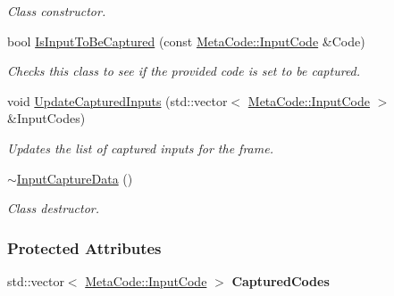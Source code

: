 \begin{DoxyCompactItemize}
\begin{DoxyCompactList}\small\item\em Class constructor. \item\end{DoxyCompactList}\item 
bool \hyperlink{classMezzanine_1_1UI_1_1InputCaptureData_a7a98f65e0666098367faf7d186a82e7f}{IsInputToBeCaptured} (const \hyperlink{classMezzanine_1_1MetaCode_a3b5633f0145bf3287cf53a3f05b5563c}{MetaCode::InputCode} \&Code)
\begin{DoxyCompactList}\small\item\em Checks this class to see if the provided code is set to be captured. \item\end{DoxyCompactList}\item 
void \hyperlink{classMezzanine_1_1UI_1_1InputCaptureData_a3a5e02a1c9606f4be323a40b6766f675}{UpdateCapturedInputs} (std::vector$<$ \hyperlink{classMezzanine_1_1MetaCode_a3b5633f0145bf3287cf53a3f05b5563c}{MetaCode::InputCode} $>$ \&InputCodes)
\begin{DoxyCompactList}\small\item\em Updates the list of captured inputs for the frame. \item\end{DoxyCompactList}\item 
\hypertarget{classMezzanine_1_1UI_1_1InputCaptureData_a5af70301db449b037a56316ef7513f0a}{
\hyperlink{classMezzanine_1_1UI_1_1InputCaptureData_a5af70301db449b037a56316ef7513f0a}{$\sim$InputCaptureData} ()}
\label{classMezzanine_1_1UI_1_1InputCaptureData_a5af70301db449b037a56316ef7513f0a}

\begin{DoxyCompactList}\small\item\em Class destructor. \item\end{DoxyCompactList}\end{DoxyCompactItemize}
\subsubsection*{Protected Attributes}
\begin{DoxyCompactItemize}
\item 
\hypertarget{classMezzanine_1_1UI_1_1InputCaptureData_a11dc6ade6f0b363f1a59a6eb00848567}{
std::vector$<$ \hyperlink{classMezzanine_1_1MetaCode_a3b5633f0145bf3287cf53a3f05b5563c}{MetaCode::InputCode} $>$ {\bfseries CapturedCodes}}
\label{classMezzanine_1_1UI_1_1InputCaptureData_a11dc6ade6f0b363f1a59a6eb00848567}

\end{DoxyCompactItemize}



